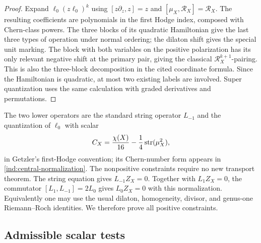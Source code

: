 \begin{proof}
Expand \(\ell_0(z\ell_0)^k\) using
\([z\partial_z,z]=z\) and \([\mu_X,\mathcal R_X]=\mathcal R_X\).
The resulting coefficients are polynomials in the first Hodge index, composed with Chern-class powers. The three blocks of its quadratic Hamiltonian give the last three types of operation under normal ordering; the dilaton shift gives the special unit marking. The block with both variables on the positive polarization has its only relevant negative shift at the primary pair, giving the classical \(\mathcal R_X^{k+1}\)-pairing. This is also the three-block decomposition in the cited coordinate formula. Since the Hamiltonian is quadratic, at most two existing labels are involved. Super quantization uses the same calculation with graded derivatives and permutations.
\end{proof}

The two lower operators are the standard string operator \(L_{-1}\) and the quantization of \(\ell_0\) with scalar
\[
 C_X=\frac{\chi(X)}{16}-\frac14\operatorname{str}(\mu_X^2),
\]
in Getzler's first-Hodge convention; its Chern-number form appears in \eqref{ind:central-normalization}. The nonpositive constraints require no new transport theorem. The string equation gives \(L_{-1}Z_X=0\). Together with \(L_1Z_X=0\), the commutator \([L_1,L_{-1}]=2L_0\) gives \(L_0Z_X=0\) with this normalization. Equivalently one may use the usual dilaton, homogeneity, divisor, and genus-one Riemann--Roch identities. We therefore prove all positive constraints.

\subsection{Admissible scalar tests}

